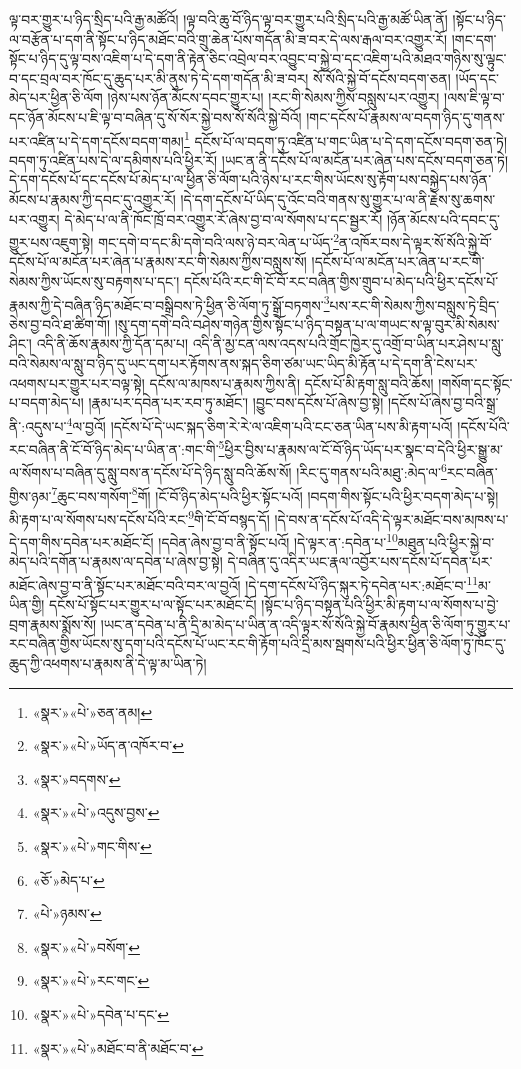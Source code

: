 ལྟ་བར་གྱུར་པ་ཉིད་སྲིད་པའི་རྒྱ་མཚོའོ། །ལྟ་བའི་ཆུ་བོ་ཉིད་ལྟ་བར་གྱུར་པའི་སྲིད་པའི་རྒྱ་མཚོ་ཡིན་ནོ། །སྟོང་པ་ཉིད་ལ་བརྩོན་པ་དག་ནི་སྟོང་པ་ཉིད་མཐོང་བའི་གྲུ་ཆེན་པོས་གདོན་མི་ཟ་བར་དེ་ལས་རྒལ་བར་འགྱུར་རོ། །གང་དག་སྟོང་པ་ཉིད་དུ་ལྟ་བས་འཇིག་པ་དེ་དག་ནི་རྟེན་ཅིང་འབྲེལ་བར་འབྱུང་བ་སྐྱེ་བ་དང་འཇིག་པའི་མཐའ་གཉིས་སུ་ལྟུང་བ་དང་བྲལ་བར་ཁོང་དུ་ཆུད་པར་མི་ནུས་ཏེ་དེ་དག་གདོན་མི་ཟ་བར། སོ་སོའི་སྐྱེ་བོ་དངོས་བདག་ཅན། །ཡོད་དང་མེད་པར་ཕྱིན་ཅི་ལོག །ཉེས་པས་ཉོན་མོངས་དབང་གྱུར་པ། །རང་གི་སེམས་ཀྱིས་བསླུས་པར་འགྱུར། །ལས་ཇི་ལྟ་བ་དང་ཉོན་མོངས་པ་ཇི་ལྟ་བ་བཞིན་དུ་སོ་སོར་སྐྱེ་བས་སོ་སོའི་སྐྱེ་བོའོ། །གང་དངོས་པོ་རྣམས་ལ་བདག་ཉིད་དུ་གནས་པར་འཛིན་པ་དེ་དག་དངོས་བདག་གམ།\footnote{«སྣར་»«པེ་»ཅན་ནམ།} དངོས་པོ་ལ་བདག་ཏུ་འཛིན་པ་གང་ཡིན་པ་དེ་དག་དངོས་བདག་ཅན་ཏེ། བདག་ཏུ་འཛིན་པས་དེ་ལ་དམིགས་པའི་ཕྱིར་རོ། །ཡང་ན་ནི་དངོས་པོ་ལ་མངོན་པར་ཞེན་པས་དངོས་བདག་ཅན་ཏེ། དེ་དག་དངོས་པོ་དང་དངོས་པོ་མེད་པ་ལ་ཕྱིན་ཅི་ལོག་པའི་ཉེས་པ་རང་གིས་ཡོངས་སུ་རྟོག་པས་བསྐྱེད་པས་ཉོན་མོངས་པ་རྣམས་ཀྱི་དབང་དུ་འགྱུར་རོ། །དེ་དག་དངོས་པོ་ཡིད་དུ་འོང་བའི་གནས་སུ་གྱུར་པ་ལ་ནི་རྗེས་སུ་ཆགས་པར་འགྱུར། དེ་མེད་པ་ལ་ནི་ཁོང་ཁྲོ་བར་འགྱུར་རོ་ཞེས་བྱ་བ་ལ་སོགས་པ་དང་སྦྱར་རོ། །ཉོན་མོངས་པའི་དབང་དུ་གྱུར་པས་འཇུག་སྟེ། གང་དགེ་བ་དང་མི་དགེ་བའི་ལས་ཉེ་བར་ལེན་པ་ཡོད་\footnote{«སྣར་»«པེ་»ཡོད་ན་འཁོར་བ་}ན་འཁོར་བས་དེ་ལྟར་སོ་སོའི་སྐྱེ་བོ་དངོས་པོ་ལ་མངོན་པར་ཞེན་པ་རྣམས་རང་གི་སེམས་ཀྱིས་བསླུས་སོ། །དངོས་པོ་ལ་མངོན་པར་ཞེན་པ་རང་གི་སེམས་ཀྱིས་ཡོངས་སུ་བརྟགས་པ་དང་། དངོས་པོའི་རང་གི་ངོ་བོ་རང་བཞིན་གྱིས་གྲུབ་པ་མེད་པའི་ཕྱིར་དངོས་པོ་རྣམས་ཀྱི་དེ་བཞིན་ཉིད་མཐོང་བ་བསྒྲིབས་ཏེ་ཕྱིན་ཅི་ལོག་ཏུ་སྒྲོ་བཏགས་\footnote{«སྣར་»བདགས་}པས་རང་གི་སེམས་ཀྱིས་བསླུས་ཏེ་བྲིད་ཅེས་བྱ་བའི་ཐ་ཚིག་གོ། །སུ་དག་དགེ་བའི་བཤེས་གཉེན་གྱིས་སྟོང་པ་ཉིད་བསྟན་པ་ལ་གཡང་ས་ལྟ་བུར་མི་སེམས་ཤིང་། འདི་ནི་ཆོས་རྣམས་ཀྱི་དོན་དམ་པ། འདི་ནི་མྱ་ངན་ལས་འདས་པའི་གྲོང་ཁྱེར་དུ་འགྲོ་བ་ཡིན་པར་ཤེས་པ་སླུ་བའི་སེམས་ལ་སླུ་བ་ཉིད་དུ་ཡང་དག་པར་རྟོགས་ནས་སྐད་ཅིག་ཙམ་ཡང་ཡིད་མི་རྟོན་པ་དེ་དག་ནི་ངེས་པར་འཕགས་པར་གྱུར་པར་བལྟ་སྟེ། དངོས་ལ་མཁས་པ་རྣམས་ཀྱིས་ནི། དངོས་པོ་མི་རྟག་སླུ་བའི་ཆོས། །གསོག་དང་སྟོང་པ་བདག་མེད་པ། །རྣམ་པར་དབེན་པར་རབ་ཏུ་མཐོང་། །བྱུང་བས་དངོས་པོ་ཞེས་བྱ་སྟེ། །དངོས་པོ་ཞེས་བྱ་བའི་སྒྲ་ནི་:འདུས་པ་\footnote{«སྣར་»«པེ་»འདུས་བྱས་}ལ་བྱའོ། །དངོས་པོ་དེ་ཡང་སྐད་ཅིག་རེ་རེ་ལ་འཇིག་པའི་ངང་ཅན་ཡིན་པས་མི་རྟག་པའོ། །དངོས་པོའི་རང་བཞིན་ནི་ངོ་བོ་ཉིད་མེད་པ་ཡིན་ན་:གང་གི་\footnote{«སྣར་»«པེ་»གང་གིས་}ཕྱིར་བྱིས་པ་རྣམས་ལ་ངོ་བོ་ཉིད་ཡོད་པར་སྣང་བ་དེའི་ཕྱིར་སྒྱུ་མ་ལ་སོགས་པ་བཞིན་དུ་སླུ་བས་ན་དངོས་པོ་དེ་ཉིད་སླུ་བའི་ཆོས་སོ། །རིང་དུ་གནས་པའི་མཐུ་:མེད་ལ་\footnote{«ཅོ་»མེད་པ་}རང་བཞིན་གྱིས་ཉམ་\footnote{«པེ་»ཉམས་}ཆུང་བས་གསོག་\footnote{«སྣར་»«པེ་»བསོག་}གོ། །ངོ་བོ་ཉིད་མེད་པའི་ཕྱིར་སྟོང་པའོ། །བདག་གིས་སྟོང་པའི་ཕྱིར་བདག་མེད་པ་སྟེ། མི་རྟག་པ་ལ་སོགས་པས་དངོས་པོའི་རང་\footnote{«སྣར་»«པེ་»རང་གང་}གི་ངོ་བོ་བསྙད་དོ། །དེ་བས་ན་དངོས་པོ་འདི་དེ་ལྟར་མཐོང་བས་མཁས་པ་དེ་དག་གིས་དབེན་པར་མཐོང་ངོ། །དབེན་ཞེས་བྱ་བ་ནི་སྟོང་པའོ། །དེ་ལྟར་ན་:དབེན་པ་\footnote{«སྣར་»«པེ་»དབེན་པ་དང་}མཐུན་པའི་ཕྱིར་སྐྱེ་བ་མེད་པའི་དགོན་པ་རྣམས་ལ་དབེན་པ་ཞེས་བྱ་སྟེ། དེ་བཞིན་དུ་འདིར་ཡང་རྣལ་འབྱོར་པས་དངོས་པོ་དབེན་པར་མཐོང་ཞེས་བྱ་བ་ནི་སྟོང་པར་མཐོང་བའི་བར་ལ་བྱའོ། །དེ་དག་དངོས་པོ་ཉིད་སྐུར་ཏེ་དབེན་པར་:མཐོང་བ་\footnote{«སྣར་»«པེ་»མཐོང་བ་ནི་མཐོང་བ་}མ་ཡིན་གྱི། དངོས་པོ་སྟོང་པར་གྱུར་པ་ལ་སྟོང་པར་མཐོང་ངོ། །སྟོང་པ་ཉིད་བསྟན་པའི་ཕྱིར་མི་རྟག་པ་ལ་སོགས་པ་བྱེ་བྲག་རྣམས་སྨོས་སོ། །ཡང་ན་དབེན་པ་ནི་དྲི་མ་མེད་པ་ཡིན་ན་འདི་ལྟར་སོ་སོའི་སྐྱེ་བོ་རྣམས་ཕྱིན་ཅི་ལོག་ཏུ་གྱུར་པ་རང་བཞིན་གྱིས་ཡོངས་སུ་དག་པའི་དངོས་པོ་ཡང་རང་གི་རྟོག་པའི་དྲི་མས་སྦགས་པའི་ཕྱིར་ཕྱིན་ཅི་ལོག་ཏུ་ཁོང་དུ་ཆུད་ཀྱི་འཕགས་པ་རྣམས་ནི་དེ་ལྟ་མ་ཡིན་ཏེ། 